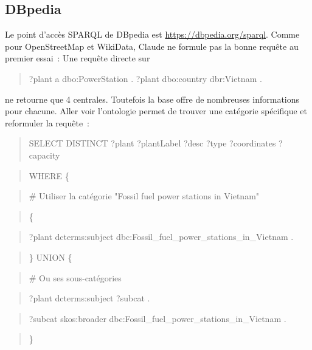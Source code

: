 \documentclass[a4paper,11pt]{report}
\begin{document}
\subsection{DBpedia}\label{dbpedia}

Le point d'accès SPARQL de DBpedia est \url{https://dbpedia.org/sparql}. Comme pour OpenStreetMap et WikiData, Claude ne formule pas la bonne requête au premier essai~: Une requête directe sur

\begin{quote}
?plant a dbo:PowerStation . ?plant dbo:country dbr:Vietnam .
\end{quote}

ne retourne que 4 centrales. Toutefois la base offre de nombreuses informations pour chacune. Aller voir l'ontologie permet de trouver une catégorie spécifique et reformuler la requête~:

\begin{quote}
SELECT DISTINCT ?plant ?plantLabel ?desc ?type ?coordinates ?capacity
\end{quote}

\begin{quote}
WHERE \{
\end{quote}

\begin{quote}
\# Utiliser la catégorie "Fossil fuel power stations in Vietnam"
\end{quote}

\begin{quote}
\{
\end{quote}

\begin{quote}
?plant dcterms:subject dbc:Fossil\_fuel\_power\_stations\_in\_Vietnam .
\end{quote}

\begin{quote}
\} UNION \{
\end{quote}

\begin{quote}
\# Ou ses sous-catégories
\end{quote}

\begin{quote}
?plant dcterms:subject ?subcat .
\end{quote}

\begin{quote}
?subcat skos:broader dbc:Fossil\_fuel\_power\_stations\_in\_Vietnam .
\end{quote}

\begin{quote}
\}
\end{quote}
\end{document}
